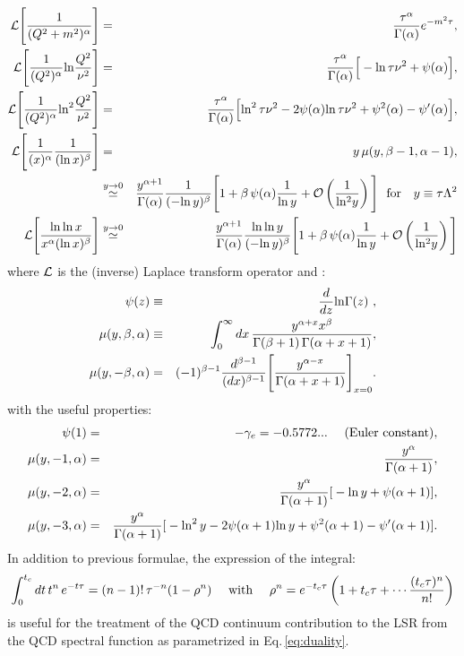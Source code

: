 \documentclass[aps,prd,groupedaddress,nofootinbib]{revtex4-1}
\def\beq{\begin{equation}}
\def\eeq{\end{equation}}
\def\bea{\begin{eqnarray}}
\def\eea{\end{eqnarray}}
\def\nnb{\nonumber}
\def\ga{\left(}
\def\dr{\right)}
\def\nnb{\nonumber}
\begin{document}
\bea
{\cal L}\Bigg{[}\frac{1}{(Q^2+m^2)^{\alpha}}\Bigg{]}&=&\frac{\tau^{\alpha}}{\Gamma(\alpha)}e^{-m^2\tau},\nnb\\
{\cal L}\Bigg{[}\frac{1}{(Q^2)^{\alpha}}{\rm ln}\frac{Q^2}{\nu^2}\Bigg{]}&=&\frac{\tau^{\alpha}}{\Gamma(\alpha)}\Big{[}-{\rm ln}\,\tau\nu^2+\psi(\alpha)\Big{]},\nnb\\
{\cal L}\Bigg{[}\frac{1}{(Q^2)^{\alpha}}{\rm ln}^2\frac{Q^2}{\nu^2}\Bigg{]}&=&\frac{\tau^{\alpha}}{\Gamma(\alpha)}\Big{[} {\rm ln}^2\,\tau\nu^2-2\psi(\alpha){\rm ln}\,\tau\nu^2+\psi^2(\alpha)-\psi'(\alpha)\Big{]},\nnb\\
{\cal L}\Bigg{[}\frac{1}{(x)^{\alpha}} \frac{1}{({\rm ln}\,x)^{\beta}}\Bigg{]}&=&y\,\mu(y,\beta-1,\alpha-1),\nnb\\
&\stackrel{y\to 0}{\simeq}&\frac{y^{\alpha+1}}{\Gamma(\alpha)}\frac{1}{(-{\rm ln\,}y)^{\beta}}\Bigg{[}1+\beta\,\psi(\alpha)\frac{1}{{\rm ln\,}y}+{\cal O}\ga \frac{1}{{\rm ln^2}y}\dr\Bigg{]}~~{\rm for}~~~y\equiv \tau\Lambda^2\nnb\\
{\cal L}\Bigg{[}  \frac{{\rm ln\,ln}\, x}  {x^\alpha ({\rm ln}\, x)^\beta} \Bigg{]}& 
\stackrel{y\to 0}{\simeq}
& \frac{y^{\alpha+1}}{\Gamma(\alpha)} \frac{{\rm ln\,ln}\, y}  { ({\rm -ln}\, y)^\beta} \Bigg{[}1+\beta\,\psi(\alpha)\frac{1}{{\rm ln\,}y}+{\cal O}\ga \frac{1}{{\rm ln^2}y}\dr\Bigg{]}
\eea
where ${\cal L}$ is the (inverse) Laplace transform operator  and :
\bea
\psi(z)&\equiv& \frac{d}{dz}{\rm ln}\Gamma(z)~,\nnb\\
\mu(y,\beta,\alpha)&\equiv&\int_0^\infty dx\,\frac{y^{\alpha+x}x^\beta}{\Gamma(\beta+1)\,\Gamma(\alpha+x+1)},\nnb\\
\mu(y,-\beta,\alpha)&=&(-1)^{\beta-1}\frac{d^{\beta-1}}{(dx)^{\beta-1}}\Bigg{[}
\frac{y^{\alpha-x}}{\Gamma(\alpha+x+1)}\Bigg{]}_{x=0}.
\eea
with the useful properties:
\bea
\psi(1)&=&-\gamma_e=-0.5772...~~~~ ({\rm Euler ~constant}),\nnb\\
\mu(y,-1,\alpha)&=&\frac{y^\alpha}{\Gamma(\alpha+1)},\nnb\\
\mu(y,-2,\alpha)&=&\frac{y^\alpha}{\Gamma(\alpha+1)}{[} -{\rm ln}\,y+\psi(\alpha+1){]},\nnb\\
\mu(y,-3,\alpha)&=&\frac{y^\alpha}{\Gamma(\alpha+1)}{[} -{\rm ln}^2\,y-2\psi(\alpha+1){\rm ln}\,y+\psi^2(\alpha+1)-\psi'(\alpha+1){]}.
\eea
In addition to previous formulae, the expression of the integral:
\beq
\int_0^{t_c}dt\,t^n\,e^{-t\tau}=(n-1)!\,\tau^{-n}(1-\rho^n)~~~~{\rm with~~~~}
\rho^n=e^{-t_c\tau}\ga 1+t_c\tau+\cdots \frac{(t_c\tau)^n}{n!}\dr
\eeq
is useful for the treatment of the QCD continuum contribution to the LSR from the QCD spectral  function as parametrized in Eq.\,\ref{eq:duality}.
\end{document}
